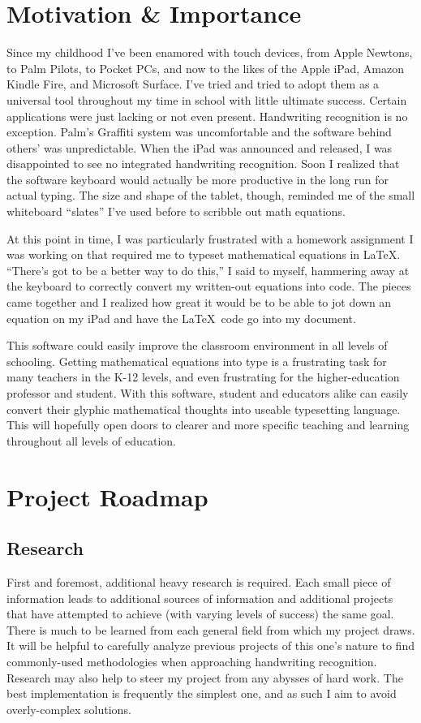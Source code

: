 \documentclass{acm_proc_article-sp}
\begin{document}
\section{Motivation \& Importance}
Since my childhood I've been enamored with touch devices, from Apple Newtons, to Palm Pilots, to Pocket PCs, and now to the likes of the Apple iPad, Amazon Kindle Fire, and Microsoft Surface. I've tried and tried to adopt them as a universal tool throughout my time in school with little ultimate success. Certain applications were just lacking or not even present. Handwriting recognition is no exception. Palm's Graffiti system was uncomfortable and the software behind others' was unpredictable. When the iPad was announced and released, I was disappointed to see no integrated handwriting recognition. Soon I realized that the software keyboard would actually be more productive in the long run for actual typing. The size and shape of the tablet, though, reminded me of the small whiteboard ``slates'' I've used before to scribble out math equations. 

At this point in time, I was particularly frustrated with a homework assignment I was working on that required me to typeset mathematical equations in \LaTeX. ``There's got to be a better way to do this,'' I said to myself, hammering away at the keyboard to correctly convert my written-out equations into code. The pieces came together and I realized how great it would be to be able to jot down an equation on my iPad and have the \LaTeX\ code go into my document.

This software could easily improve the classroom environment in all levels of schooling. Getting mathematical equations into type is a frustrating task for many teachers in the K-12 levels, and even frustrating for the higher-education professor and student. With this software, student and educators alike can easily convert their glyphic mathematical thoughts into useable typesetting language. This will hopefully open doors to clearer and more specific teaching and learning throughout all levels of education.

\section{Project Roadmap}

\subsection{Research}
First and foremost, additional heavy research is required. Each small piece of information leads to additional sources of information and additional projects that have attempted to achieve (with varying levels of success) the same goal. There is much to be learned from each general field from which my project draws. It will be helpful to carefully analyze previous projects of this one's nature to find commonly-used methodologies when approaching handwriting recognition. Research may also help to steer my project from any abysses of hard work. The best implementation is frequently the simplest one, and as such I aim to avoid overly-complex solutions.
\end{document}
